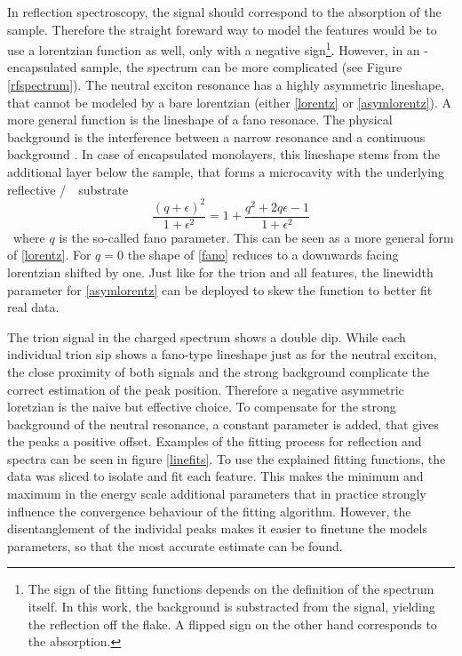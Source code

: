 In reflection spectroscopy, the signal should correspond to the absorption of the sample. Therefore the straight foreward way to model the features would be to use a lorentzian function as well, only with a negative sign\footnote{The sign of the fitting functions depends on the definition of the spectrum itself. In this work, the background is substracted from the signal, yielding the reflection off the flake. A flipped sign on the other hand corresponds to the absorption.}. However, in an \hbn-encapsulated sample, the spectrum can be more complicated (see Figure \ref{rfspectrum}). The neutral exciton resonance has a highly asymmetric lineshape, that cannot be modeled by a bare lorentzian (either \eqref{lorentz} or \eqref{asymlorentz}). A more general function is the lineshape of a fano resonace. The physical background is the interference between a narrow resonance and a continuous background \cite{fano_effects_1961}. In case of encapsulated \tmdg monolayers, this lineshape stems from the additional \hbng layer below the sample, that forms a microcavity with the underlying reflective \si/\sio substrate \cite{scuri_large_2018}.
\begin{equation}
\frac{(q+\epsilon)^2}{1+\epsilon^2} = 1 + \frac{q^2+2q\epsilon-1}{1+\epsilon^2}\label{fano}
\end{equation}
where $q$ is the so-called fano parameter. This can be seen as a more general form of \eqref{lorentz}. For $q=0$ the shape of \eqref{fano} reduces to a downwards facing lorentzian shifted by one. Just like for the trion and all \pl features, the linewidth parameter for \eqref{asymlorentz} can be deployed to skew the function to better fit real data.

The trion signal in the charged spectrum shows a double dip. While each individual trion sip shows a fano-type lineshape just as for the neutral exciton, the close proximity of both signals and the strong background complicate the correct estimation of the peak position. Therefore a negative asymmetric loretzian is the naive but effective choice. To compensate for the strong background of the neutral resonance, a constant parameter is added, that gives the peaks a positive offset. 
Examples of the fitting process for reflection and \pl spectra can be seen in figure \ref{linefits}. To use the explained fitting functions, the data was sliced to isolate and fit each feature. This makes the minimum and maximum in the energy scale additional parameters that in practice strongly influence the convergence behaviour of the fitting algorithm. However, the disentanglement of the individal peaks makes it easier to finetune the models parameters, so that the most accurate estimate can be found.



